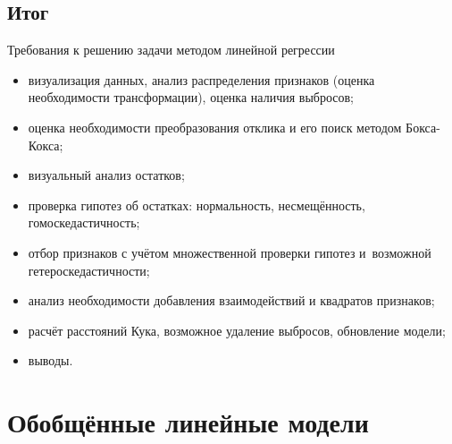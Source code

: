 \documentclass[9pt,pdf,utf8,hyperref={unicode},aspectratio=169]{beamer}
\begin{document}
\subsection{Итог}
\begin{frame}{Требования к решению задачи методом линейной регрессии}
    \begin{itemize}
    \item визуализация данных, анализ распределения признаков (оценка необходимости трансформации), оценка наличия выбросов;
    \item оценка необходимости преобразования отклика и его поиск методом Бокса-Кокса;
    \item визуальный анализ остатков;
    \item проверка гипотез об остатках: нормальность, несмещённость, гомоскедастичность;
    \item отбор признаков с учётом множественной проверки гипотез и~возможной гетероскедастичности;    
    \item анализ необходимости добавления взаимодействий и квадратов признаков;
    \item расчёт расстояний Кука, возможное удаление выбросов, обновление модели;
    \item выводы.
    \end{itemize}
\end{frame}

\section{Обобщённые линейные модели}
\end{document}
